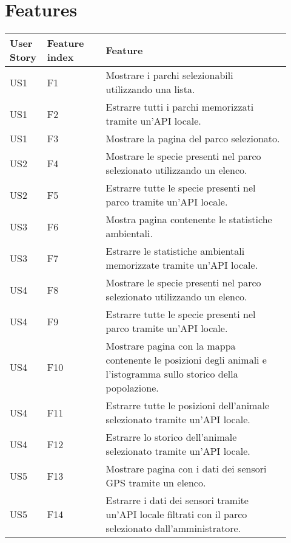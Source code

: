 \chapter{Features}
\begin{table}[ht]
    \centering
    \begin{tabular}{|m{0.09\linewidth}|m{0.2\linewidth}|m{0.63\linewidth}|}
    \hline
        \textbf{User Story} & \textbf{Feature index} & \textbf{Feature} \\
        \hline
        \rowcolor{Gray}
        US1 & F1 & Mostrare i parchi selezionabili utilizzando una lista.\\
        \hline
        US1 & F2 & Estrarre tutti i parchi memorizzati tramite un’API locale.\\
        \hline
        \rowcolor{Gray}
        US1 & F3 & Mostrare la pagina del parco selezionato.\\
        \hline
        US2 & F4 & Mostrare le specie presenti nel parco selezionato utilizzando un elenco.\\
        \hline
        \rowcolor{Gray}
        US2 & F5 & Estrarre tutte le specie presenti nel parco tramite un’API locale.\\
        \hline
        US3 & F6 & Mostra pagina contenente le statistiche ambientali.\\
        \hline
        \rowcolor{Gray}
        US3 & F7 & Estrarre le statistiche ambientali memorizzate tramite un’API locale.\\
        \hline
        US4 & F8 & Mostrare le specie presenti nel parco selezionato utilizzando un elenco.\\
        \hline 
        \rowcolor{Gray}
        US4 & F9 & Estrarre tutte le specie presenti nel parco tramite un’API locale.\\
        \hline
        US4 & F10 & Mostrare pagina con la mappa contenente le posizioni degli animali e l’istogramma sullo storico della popolazione.\\
        \hline 
        \rowcolor{Gray}
        US4 & F11 & Estrarre tutte le posizioni dell’animale selezionato tramite un’API locale.\\
        \hline
        US4 & F12 & Estrarre lo storico dell’animale selezionato tramite un’API locale.\\
        \hline 
        \rowcolor{Gray}
        US5 & F13 & Mostrare pagina con i dati dei sensori GPS tramite un elenco.\\
        \hline
        US5 & F14 & Estrarre i dati dei sensori tramite un’API locale filtrati con il parco selezionato dall’amministratore.\\

\end{tabular}
\end{table}
